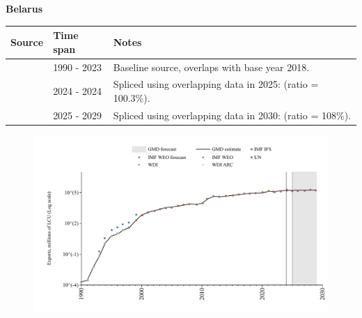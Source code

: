 \documentclass[12pt,a4paper,landscape]{article}
\begin{document}
\begin{adjustbox}{max totalsize={\paperwidth}{\paperheight},center}
\begin{minipage}[t][\textheight][t]{\textwidth}
\vspace*{0.5cm}
{}
\begin{center}
{\Large\bfseries Belarus}
\end{center}
\vspace{0.5cm}
\begin{table}[H]
\centering
\small
\begin{tabular}{|l|l|l|}
\hline
\textbf{Source} & \textbf{Time span} & \textbf{Notes} \\
\hline
\rowcolor{white}\cite{WDI}& 1990 - 2023 &Baseline source, overlaps with base year 2018.\\
\rowcolor{lightgray}\cite{IMF_IFS}& 2024 - 2024 &Spliced using overlapping data in 2025: (ratio = 100.3\%).\\
\rowcolor{white}\cite{IMF_WEO_forecast}& 2025 - 2029 &Spliced using overlapping data in 2030: (ratio = 108\%).\\
\hline
\end{tabular}
\end{table}
\begin{figure}[H]
\centering
\includegraphics[width=\textwidth,height=0.6\textheight,keepaspectratio]{graphs/BLR_exports.pdf}
\end{figure}
\end{minipage}
\end{adjustbox}
\end{document}
